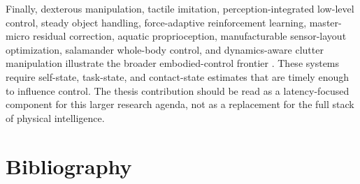 \documentclass[12pt,a4paper,oneside]{report}
\begin{document}
Finally, dexterous manipulation, tactile imitation, perception-integrated low-level control, steady object handling, force-adaptive reinforcement learning, master-micro residual correction, aquatic proprioception, manufacturable sensor-layout optimization, salamander whole-body control, and dynamics-aware clutter manipulation illustrate the broader embodied-control frontier \cite{an2025dexterous,zhao2025vitactracing,cui2025pilot,huang2026steadytray,pudasaini2026fame,li2025m2resipolicy,micklem2026aquatic,tian2026sensoropt,tian2024salamander,zheng2025dapl}. These systems require self-state, task-state, and contact-state estimates that are timely enough to influence control. The thesis contribution should be read as a latency-focused component for this larger research agenda, not as a replacement for the full stack of physical intelligence.

\chapter*{Bibliography}


\end{document}
